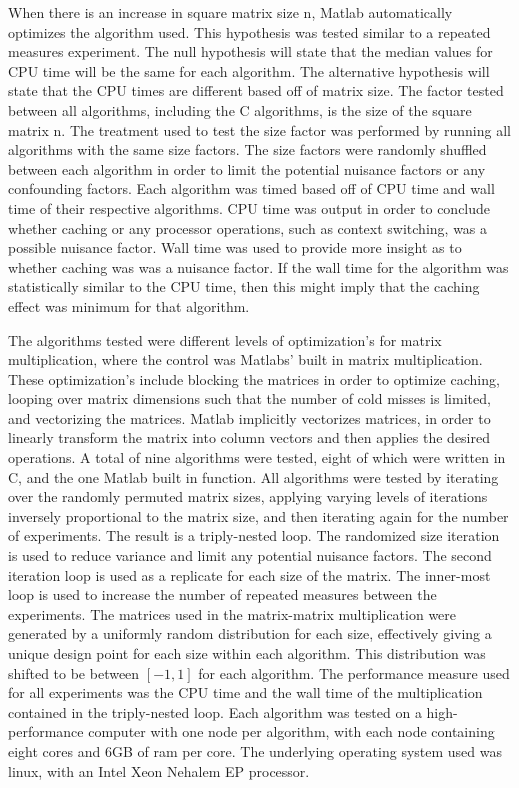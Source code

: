 \documentclass[sigconf]{acmart}
\begin{document}
When there is an increase in square matrix size n, Matlab automatically optimizes the algorithm used. This hypothesis was tested similar to a repeated measures experiment. The null hypothesis will state that the median values for CPU time will be the same for each algorithm. The alternative hypothesis will state that the CPU times are different based off of matrix size. The factor tested between all algorithms, including the C algorithms, is the size of the square matrix n. The treatment used to test the size factor was performed by running all algorithms with the same size factors. The size factors were randomly shuffled between each algorithm in order to limit the potential nuisance factors or any confounding factors. Each algorithm was timed based off of CPU time and wall time of their respective algorithms. CPU time was output in order to conclude whether caching or any processor operations, such as context switching, was a possible nuisance factor. Wall time was used to provide more insight as to whether caching was was a nuisance factor. If the wall time for the algorithm was statistically similar to the CPU time, then this might imply that the caching effect was minimum for that algorithm.

The algorithms tested were different levels of optimization's for matrix multiplication, where the control was Matlabs' built in matrix multiplication. These optimization's include blocking the matrices in order to optimize caching, looping over matrix dimensions such that the number of cold misses is limited, and vectorizing the matrices. Matlab implicitly vectorizes matrices, in order to linearly transform the matrix into column vectors and then applies the desired operations. A total of nine algorithms were tested, eight of which were written in C, and the one Matlab built in function. All algorithms were tested by iterating over the randomly permuted matrix sizes, applying varying levels of iterations inversely proportional to the matrix size, and then iterating again for the number of experiments. The result is a triply-nested loop. The randomized size iteration is used to reduce variance and limit any potential nuisance factors. The second iteration loop is used as a replicate for each size of the matrix. The inner-most loop is used to increase the number of repeated measures between the experiments. The matrices used in the matrix-matrix multiplication were generated by a uniformly random distribution for each size, effectively giving a unique design point for each size within each algorithm. This distribution was shifted to be between $[-1,1]$ for each algorithm. The performance measure used for all experiments was the CPU time and the wall time of the multiplication contained in the triply-nested loop. Each algorithm was tested on a high-performance computer with one node per algorithm, with each node containing eight cores and 6GB of ram per core. The underlying operating system used was linux, with an Intel Xeon Nehalem EP processor.
\end{document}
